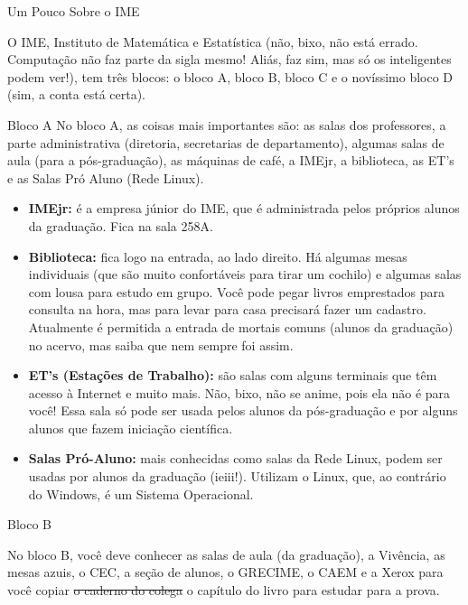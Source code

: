 \begin{secao}{Um Pouco Sobre o IME}

O IME, Instituto de Matemática e Estatística (não, bixo, não está errado.
Computação não faz parte da sigla mesmo! Aliás, faz sim, mas só os inteligentes
podem ver!),  tem três blocos: o bloco A, bloco B, bloco C e o novíssimo bloco D
(sim, a conta está certa).

\begin{subsecao}{Bloco A}
No bloco A, as coisas mais importantes são: as salas dos professores, a parte
administrativa (diretoria, secretarias de departamento), algumas salas de aula
(para a pós-graduação), as máquinas de café, a IMEjr, a biblioteca, as ET's e
as Salas Pró Aluno (Rede Linux).

\begin{itemize}

\item {\bf IMEjr:} é a empresa júnior do IME, que é administrada pelos próprios
alunos da graduação. Fica na sala 258A.

\item {\bf Biblioteca:} fica logo na entrada, ao lado direito. Há algumas mesas
individuais (que são muito confortáveis para tirar um cochilo) e algumas salas
com lousa para estudo em grupo. Você pode pegar livros emprestados para consulta
na hora, mas para levar para casa precisará fazer um cadastro. Atualmente é
permitida a entrada de mortais comuns (alunos da graduação) no acervo, mas saiba
que nem sempre foi assim.

\item {\bf ET's (Estações de Trabalho):} são salas com alguns terminais que têm
acesso à Internet e muito mais. Não, bixo, não se anime, pois ela não é para
você! Essa sala só pode ser usada pelos alunos da pós-graduação e por alguns
alunos que fazem iniciação científica.

\item {\bf Salas Pró-Aluno:} mais conhecidas como salas da Rede Linux, podem ser
usadas por alunos da graduação (ieiii!). Utilizam o Linux, que, ao contrário do
Windows, é um Sistema Operacional.

\end{itemize}
\end{subsecao}

\begin{subsecao}{Bloco B}

No bloco B, você deve conhecer as salas de aula (da graduação), a Vivência, as
mesas azuis, o CEC, a seção de alunos, o GRECIME, o CAEM e a Xerox para você
copiar \sout {o caderno do colega} o capítulo do livro para estudar para a prova.


\end{subsecao}
\end{secao}
